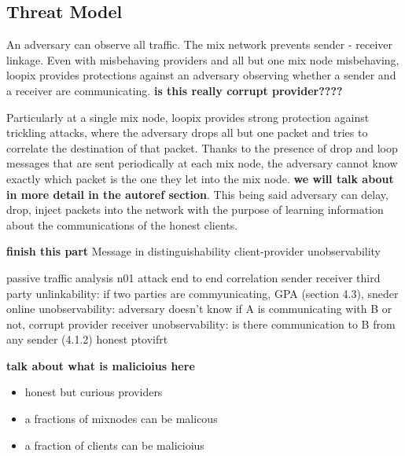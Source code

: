 \documentclass[a4paper,11pt,oneside]{report}
\begin{document}
\subsection{Threat Model}
\label{sec:loopix_assumptions}
An adversary can observe all traffic. The mix network prevents sender - receiver linkage. Even with misbehaving providers and all but one mix node misbehaving, loopix provides protections against an adversary observing whether a sender and a receiver are communicating.  \textbf{is this really corrupt provider????}

Particularly at a single mix node, loopix provides strong protection against trickling attacks, where the adversary drops all but one packet and tries to correlate the destination of that packet. Thanks to the presence of drop and loop messages that are sent periodically at each mix node, the adversary cannot know exactly which packet is the one they let into the mix node. \textbf{we will talk about in more detail in the autoref section}. This being said adversary can delay, drop, inject packets into the network with the purpose of learning information about the communications of the honest clients.

\textbf{finish this part}
Message in distinguishability
client-provider unobservability


passive traffic analysis
n01 attack
end to end correlation
sender receiver third party unlinkability: if two parties are commyunicating, GPA (section 4.3), 
sneder online unobservability: adversary doesn't know if A is communicating with B or not, corrupt provider
receiver unobservability: is there communication to B from any sender (4.1.2) honest ptovifrt

\textbf{talk about what is malicioius here}
\begin{itemize}
    \item honest but curious providers
    \item a fractions of mixnodes can be malicous
    \item a fraction of clients can be malicioius
\end{itemize}
\end{document}
